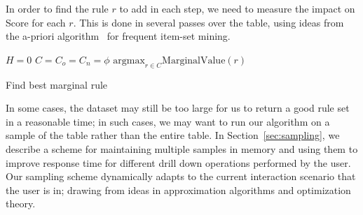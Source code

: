 \item In order to find the rule $r$ to add in each step, we need to measure the impact on Score for each $r$. This is done in several passes over the table, using ideas from the a-priori algorithm~\cite{apriori} for frequent item-set mining. 
\squishend

\begin{algorithm}
\scriptsize
{}
$H = 0$ 
$C = C_o = C_n = \phi$ 
\Return $\textrm{argmax}_{r \in C} \text{MarginalValue}(r)$
\caption{Find best marginal rule\label{algo:best-marginal-rule}}
\end{algorithm}

In some cases, the dataset may still be too large for us to return a good rule set in
a reasonable time; in such cases, we may want to run our algorithm on a sample of the table
rather than the entire table. In Section~\ref{sec:sampling}, we describe a scheme 
for maintaining multiple samples in memory and using them to improve response 
time for different drill down operations performed by the user. Our sampling scheme dynamically adapts to the current interaction scenario that the user is in; drawing from ideas in approximation algorithms and optimization theory.

